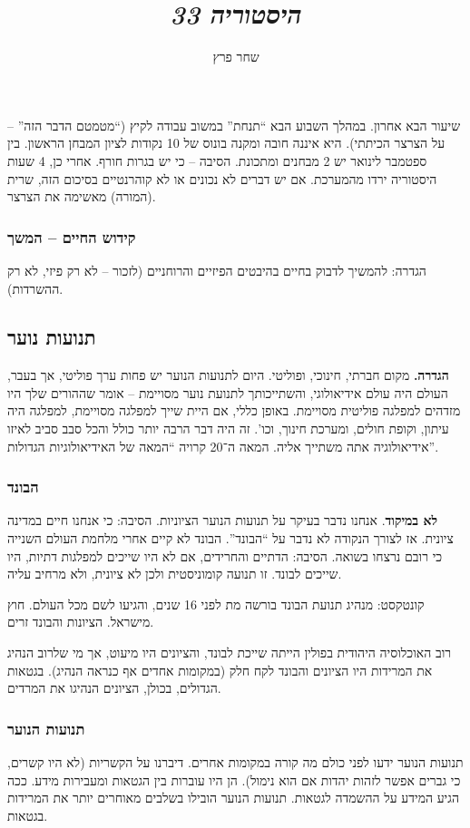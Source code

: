 \documentclass[]{article}
\author{שחר פרץ}
\title{\textit{היסטוריה 33}}
\begin{document}
    \maketitle
    
    שיעור הבא אחרון. במהלך השבוע הבא ``תנחת'' במשוב עבודה לקיץ (``מטמטם הדבר הזה'' – על הצרצר הכיתתי). היא איננה חובה ומקנה בונוס של 10 נקודות לציון המבחן הראשון. בין ספטמבר לינואר יש 2 מבחנים ומתכונת. הסיבה – כי יש בגרות חורף. אחרי כן, 4 שעות היסטוריה ירדו מהמערכת. אם יש דברים לא נכונים או לא קוהרנטיים בסיכום הזה, שרית (המורה) מאשימה את הצרצר. 
    
    \subsubsection*{קידוש החיים – המשך}
    הגדרה: להמשיך לדבוק בחיים בהיבטים הפיזיים והרוחניים (לזכור – לא רק פיזי, לא רק ההשרדות). 
    
    \subsection*{תנועות נוער}
    \textbf{הגדרה. }מקום חברתי, חינוכי, ופוליטי. היום לתנועות הנוער יש פחות ערך פוליטי, אך בעבר, העולם היה עולם אידיאולוגי, והשתייכותך לתנועת נוער מסויימת – אומר שההורים שלך היו מזדהים למפלגה פוליטית מסויימת. באופן כללי, אם היית שייך למפלגה מסויימת, למפלגה היה עיתון, וקופת חולים, ומערכת חינוך, וכו'. זה היה דבר הרבה יותר כולל והכל סבב סביב לאיזו אידיאולוגיה אתה משתייך אליה. המאה ה־20 קרויה ``המאה של האידיאולוגיות הגדולות''. 
    
    
    \subsubsection*{הבונד}
    \textbf{לא במיקוד}. 
    אנחנו נדבר בעיקר על תנועות הנוער הציוניות. הסיבה: כי אנחנו חיים במדינה ציונית. אז לצורך הנקודה לא נדבר על ``הבונד''. הבונד לא קיים אחרי מלחמת העולם השנייה כי רובם נרצחו בשואה. הסיבה: הדתיים והחרידים, אם לא היו שייכים למפלגות דתיות, היו שייכים לבונד. זו תנועה קומוניסטית ולכן לא ציונית, ולא מרחיב עליה. 
    
    קונטקסט: מנהיג תנועת הבונד בורשה מת לפני 16 שנים, והגיעו לשם מכל העולם. חוץ מישראל. הציונות והבונד זרים. 
    
    רוב האוכלוסיה היהודית בפולין הייתה שייכת לבונד, והציונים היו מיעוט, אך מי שלרוב הנהיג את המרידות היו הציונים והבונד לקח חלק (במקומות אחדים אף כנראה הנהיג). בגטאות הגדולים, בכולן, הציונים הנהיגו את המרדים. 
    
    \subsubsection*{תנועות הנוער}
    תנועות הנוער ידעו לפני כולם מה קורה במקומות אחרים. דיברנו על הקשריות (לא היו קשרים, כי גברים אפשר לזהות יהדות אם הוא נימול). הן היו עוברות בין הגטאות ומעבירות מידע. ככה הגיע המידע על ההשמדה לגטאות. תנועות הנוער הובילו בשלבים מאוחרים יותר את המרידות בגטאות. 
    
\end{document}
